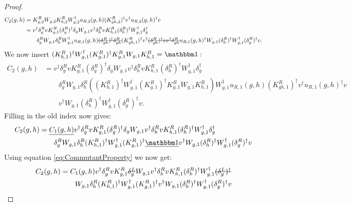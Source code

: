 \documentclass[11pt,a4paper,twoside]{article}
\numberwithin{equation}{section}
\begin{document}
\begin{proof}
		\begin{align}
			C_2(g,h)&=K_{g,2}^RW_{g,2}K_{h,2}^{R}W_{g,2}^\dagger u_{R,2}(g,h) (K_{gh,2}^R)^\dagger v^\dagger u_{R,2}(g,h)^\dagger v\\
			&=v^\dagger \delta_g^R v K_{g,1}^R (\delta_g^R)^\dagger \delta_g W_{g,1}v^\dagger \delta_h^R v K_{h,1}^R (\delta_h^R)^\dagger W_{g,1}^\dagger \delta_g^\dagger\\
			\nonumber
			&\qquad \delta_g^R W_{g,1}\delta_h^R W_{g,1}^\dagger u_{R,1}(g,h)\stkout{(\delta_{gh}^R)^\dagger \delta_{gh}^R} (K_{gh,1}^R)^\dagger v^\dagger \stkout{(\delta_{gh}^R)^\dagger v  v^\dagger \delta^R_{gh}} u_{R,1}(g,h)^\dagger W_{g,1}(\delta^R_h)^\dagger W_{g,1}^\dagger(\delta_g^R)^\dagger v.
		\end{align}
		We now insert $(K_{h,1}^R)^\dagger W_{g,1}^\dagger (K_{g,1}^R)^\dagger K_{g,1}^R W_{g,1}K_{h,1}^R=\id:$
		\begin{align}	
			C_2(g,h)&=v^\dagger \delta_g^R v K_{g,1}^R (\delta_g^R)^\dagger \delta_g W_{g,1}v^\dagger \delta_h^R v K_{h,1}^R (\delta_h^R)^\dagger W_{g,1}^\dagger \delta_g^\dagger\\
			\nonumber
			&\qquad \delta_g^R W_{g,1}\delta_h^R \left((K_{h,1}^R)^\dagger W_{g,1}^\dagger (K_{g,1}^R)^\dagger K_{g,1}^R W_{g,1}K_{h,1}^R\right) W_{g,1}^\dagger u_{R,1}(g,h) (K_{gh,1}^R)^\dagger v^\dagger u_{R,1}(g,h)^\dagger v\\
			\nonumber
			&\qquad v^\dagger W_{g,1}(\delta^R_h)^\dagger W_{g,1}^\dagger(\delta_g^R)^\dagger v.
		\end{align}
		Filling in the old index now gives:
		\begin{align}
			C_2(g,h)&=\underline{C_1(g,h)}v^\dagger \delta_g^R v K_{g,1}^R (\delta_g^R)^\dagger \delta_g W_{g,1}v^\dagger \delta_h^R v K_{h,1}^R (\delta_h^R)^\dagger W_{g,1}^\dagger \delta_g^\dagger\\
			\nonumber
			&\qquad \delta_g^R W_{g,1}\delta_h^R (K_{h,1}^R)^\dagger W_{g,1}^\dagger (K_{g,1}^R)^\dagger \underline{\id} v^\dagger W_{g,1}(\delta^R_h)^\dagger W_{g,1}^\dagger(\delta_g^R)^\dagger v
		\end{align}
		Using equation \eqref{eq:CommutantProperty} we now get:
		\begin{align}
			C_2(g,h)&=C_1(g,h)v^\dagger \delta_g^R v K_{g,1}^R \stkout{\delta_g^L} W_{g,1}v^\dagger \delta_h^R v K_{h,1}^R (\delta_h^R)^\dagger W_{g,1}^\dagger \stkout{(\delta_g^L)^\dagger}\\
			\nonumber
			&\qquad  W_{g,1}\delta_h^R (K_{h,1}^R)^\dagger W_{g,1}^\dagger (K_{g,1}^R)^\dagger v^\dagger W_{g,1}(\delta^R_h)^\dagger W_{g,1}^\dagger(\delta_g^R)^\dagger v\\

\end{align}
\end{proof}
\end{document}
